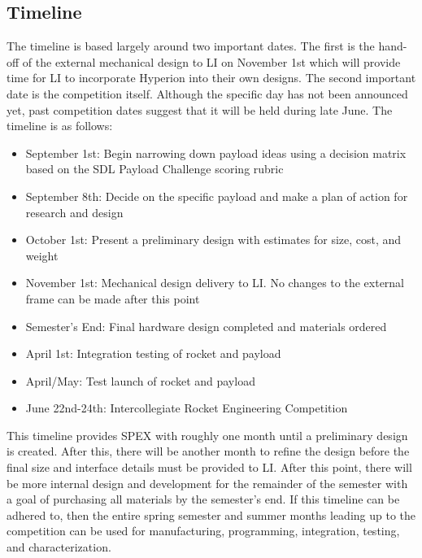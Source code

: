 \documentclass[conference]{IEEEtran} %
\begin{document}
\subsection{Timeline}
\label{subsec:Timeline}
The timeline is based largely around two important dates. The first is the hand-off of the external mechanical design to LI on November 1st which will provide time for LI
to incorporate Hyperion into their own designs. The second important date is the competition itself. Although the specific day has not been announced yet, past competition dates
suggest that it will be held during late June. The timeline is as follows:
\begin{itemize}
  \item September 1st: Begin narrowing down payload ideas using a decision matrix based on the SDL Payload Challenge scoring rubric
  \item September 8th: Decide on the specific payload and make a plan of action for research and design
  \item October 1st: Present a preliminary design with estimates for size, cost, and weight
  \item November 1st: Mechanical design delivery to LI. No changes to the external frame can be made after this point
  \item Semester's End: Final hardware design completed and materials ordered
  \item April 1st: Integration testing of rocket and payload
  \item April/May: Test launch of rocket and payload
  \item June 22nd-24th: Intercollegiate Rocket Engineering Competition
\end{itemize}

This timeline provides SPEX with roughly one month until a preliminary design is created. After this, there will be another month to refine
the design before the final size and interface details must be provided to LI. After this point, there will be more internal
design and development for the remainder of the semester with a goal of purchasing all materials by the semester's end.
If this timeline can be adhered to, then the entire spring semester and summer months leading up to the competition can be
used for manufacturing, programming, integration, testing, and characterization.
\end{document}
